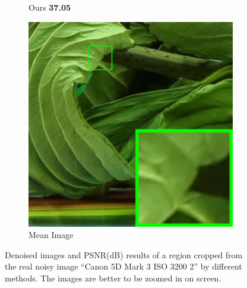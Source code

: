 \begin{figure}
\begin{subfigure}[t]{0.19\textwidth}
\caption{Ours \textbf{37.05}}
    \end{subfigure}
    \hfill
    \begin{subfigure}[t]{0.19\textwidth}
        \centering
        \includegraphics[width=1\textwidth]{images/guided/cc15/resize_br_Mean_5dmark3_iso3200_2_real.png}
\caption{Mean Image}
    \end{subfigure}
    \caption{Denoised images and PSNR(dB) results of a region cropped from the real noisy image ``Canon 5D Mark 3 ISO 3200 2'' \cite{crosschannel2016} by different methods. The images are better to be zoomed in on screen.}
    \label{fig3-13}
\end{figure}

